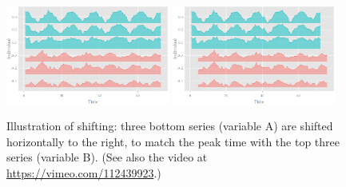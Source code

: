 \documentclass[12pt]{article}
\begin{document}
\begin{center}
\begin{figure}[htp]
\begin{centering}
\includegraphics[width=0.48\textwidth]{graph/pipeline-19-original}
\includegraphics[width=0.48\textwidth]{graph/pipeline-19-shifting}
\end{centering}
\caption{\label{fig:x-shifting}Illustration of shifting: three bottom series (variable A) are shifted horizontally to the right, to match the peak time with the top three series (variable B). (See also the video at \url{https://vimeo.com/112439923}.)}
\end{figure}
\end{center}

\end{document}
